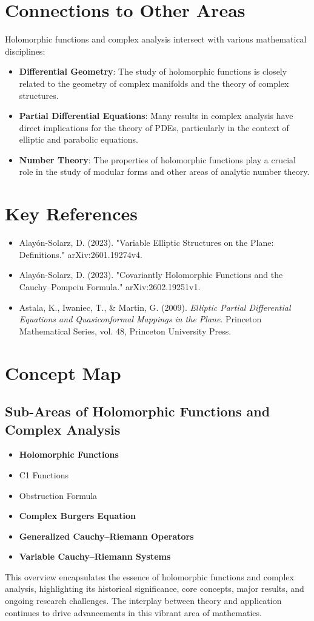 \documentclass[11pt,a4paper]{article}
\begin{document}
\section{Connections to Other Areas}
Holomorphic functions and complex analysis intersect with various mathematical disciplines:
\begin{itemize}
\item \textbf{Differential Geometry}: The study of holomorphic functions is closely related to the geometry of complex manifolds and the theory of complex structures.
\item \textbf{Partial Differential Equations}: Many results in complex analysis have direct implications for the theory of PDEs, particularly in the context of elliptic and parabolic equations.
\item \textbf{Number Theory}: The properties of holomorphic functions play a crucial role in the study of modular forms and other areas of analytic number theory.
\end{itemize}

\section{Key References}
\begin{itemize}
\item Alayón-Solarz, D. (2023). "Variable Elliptic Structures on the Plane: Definitions." arXiv:2601.19274v4.
\item Alayón-Solarz, D. (2023). "Covariantly Holomorphic Functions and the Cauchy--Pompeiu Formula." arXiv:2602.19251v1.
\item Astala, K., Iwaniec, T., & Martin, G. (2009). \textit{Elliptic Partial Differential Equations and Quasiconformal Mappings in the Plane}. Princeton Mathematical Series, vol. 48, Princeton University Press.
\end{itemize}

\section{Concept Map}
\subsection{Sub-Areas of Holomorphic Functions and Complex Analysis}
\begin{itemize}
\item \textbf{Holomorphic Functions}
\item C1 Functions
\item Obstruction Formula
\item \textbf{Complex Burgers Equation}
\item \textbf{Generalized Cauchy--Riemann Operators}
\item \textbf{Variable Cauchy--Riemann Systems}
\end{itemize}

This overview encapsulates the essence of holomorphic functions and complex analysis, highlighting its historical significance, core concepts, major results, and ongoing research challenges. The interplay between theory and application continues to drive advancements in this vibrant area of mathematics.
\end{document}
